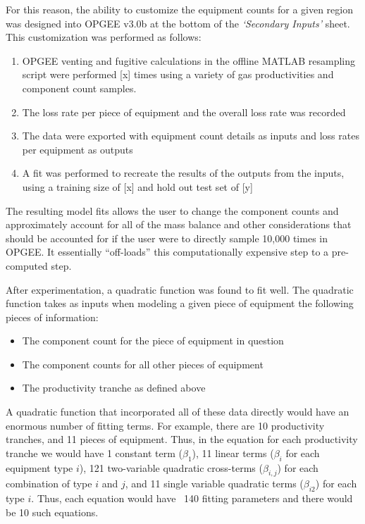 \documentclass[11pt]{report}
\newcommand{\version}{v3.0b }
\newcommand{\sheet}[1]{\textit{`{#1}'}}
\begin{document}
For this reason, the ability to customize the equipment counts for a given region was designed into OPGEE \version at the bottom of the \sheet{Secondary Inputs} sheet. This customization was performed as follows:
\begin{enumerate}
\item OPGEE venting and fugitive calculations in the offline MATLAB resampling script were performed [x] times using a variety of gas productivities and component count samples.
\item The loss rate per piece of equipment and the overall loss rate was recorded
\item The data were exported with equipment count details as inputs and loss rates per equipment as outputs
\item A fit was performed to recreate the results of the outputs from the inputs, using a training size of [x] and hold out test set of [y]
\end{enumerate} 

The resulting model fits allows the user to change the component counts and approximately account for all of the mass balance and other considerations that should be accounted for if the user were to directly sample 10,000 times in OPGEE. It essentially ``off-loads'' this computationally expensive step to a pre-computed step. 

After experimentation, a quadratic function was found to fit well. The quadratic function takes as inputs when modeling a given piece of equipment the following pieces of information:
\begin{itemize}
\item The component count for the piece of equipment in question
\item The component counts for all other pieces of equipment
\item The productivity tranche as defined above
\end{itemize}

A quadratic function that incorporated all of these data directly would have an enormous number of fitting terms. For example, there are 10 productivity tranches, and 11 pieces of equipment. Thus, in the equation for each productivity tranche we would have 1 constant term ($\beta_1$), 11 linear terms ($\beta_i$ for each equipment type $i$), 121 two-variable quadratic cross-terms ($\beta_{i,j}$) for each combination of type $i$ and $j$, and 11 single variable quadratic terms ($\beta_{i2}$) for each type $i$. Thus, each equation would have ~140 fitting parameters and there would be 10 such equations.
\end{document}
